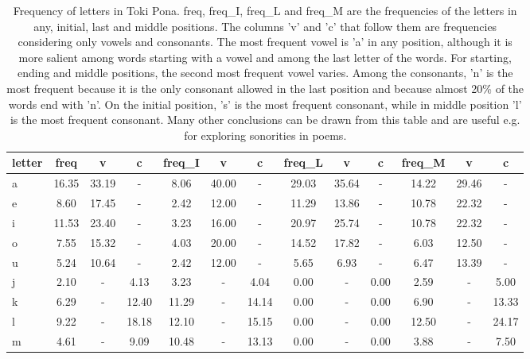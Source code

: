 \begin{table*}[h!]
\scriptsize
\begin{center}
\caption{Frequency of letters in Toki Pona.
            freq, freq\_I, freq\_L and freq\_M are
            the frequencies of the letters in any, initial, last and middle
            positions.
            The columns 'v' and 'c' that follow them are frequencies
            considering only vowels and consonants.
            The most frequent vowel is 'a' in any position,
            although it is more salient among words starting with a vowel
            and among the last letter of the words.
            For starting, ending and middle positions, the second most frequent
            vowel varies.
            Among the consonants, 'n' is the most frequent because it is
            the only consonant allowed in the last position and because
            almost 20\% of the words end with 'n'.
            On the initial position, 's' is the most frequent consonant,
            while in middle position 'l' is the most frequent consonant.
            Many other conclusions can be drawn from this table and are
            useful e.g. for exploring sonorities in poems.}\label{freqLet}
\begin{tabular}{  l | c   c   c | c   c   c | c   c   c | c   c   c  }
letter & freq  & v  & c  & freq\_I  & v  & c  & freq\_L  & v  & c  & freq\_M  & v  & c \\\hline
a & 16.35  & 33.19  & -  & 8.06  & 40.00  & -  & 29.03  & 35.64  & -  & 14.22  & 29.46  & - \\
e & 8.60  & 17.45  & -  & 2.42  & 12.00  & -  & 11.29  & 13.86  & -  & 10.78  & 22.32  & - \\
i & 11.53  & 23.40  & -  & 3.23  & 16.00  & -  & 20.97  & 25.74  & -  & 10.78  & 22.32  & - \\
o & 7.55  & 15.32  & -  & 4.03  & 20.00  & -  & 14.52  & 17.82  & -  & 6.03  & 12.50  & - \\
u & 5.24  & 10.64  & -  & 2.42  & 12.00  & -  & 5.65  & 6.93  & -  & 6.47  & 13.39  & - \\\hline
j & 2.10  & -  & 4.13  & 3.23  & -  & 4.04  & 0.00  & -  & 0.00  & 2.59  & -  & 5.00 \\
k & 6.29  & -  & 12.40  & 11.29  & -  & 14.14  & 0.00  & -  & 0.00  & 6.90  & -  & 13.33 \\
l & 9.22  & -  & 18.18  & 12.10  & -  & 15.15  & 0.00  & -  & 0.00  & 12.50  & -  & 24.17 \\\hline
m & 4.61  & -  & 9.09  & 10.48  & -  & 13.13  & 0.00  & -  & 0.00  & 3.88  & -  & 7.50 \\

\end{tabular}
\end{center}
\end{table*}
